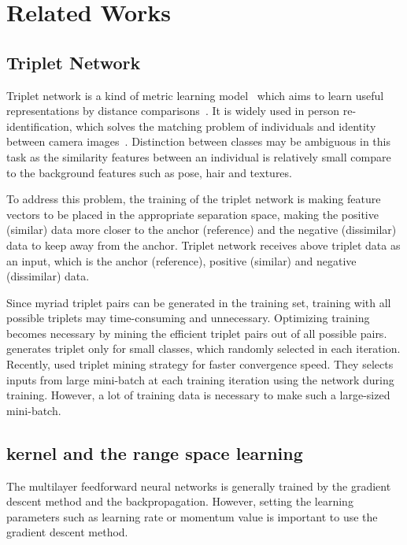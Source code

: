 \documentclass[runningheads]{llncs}
\begin{document}
\section{Related Works}

\subsection{Triplet Network}
Triplet network is a kind of metric learning model~\cite{} which aims to learn useful representations by distance comparisons~\cite{hoffer2015deep}. It is widely used in person re-identification, which solves the matching problem of individuals and identity between camera images~\cite{chen2017beyond,cheng2016person,ding2015deep,schroff2015facenet,wang2016joint}. 
Distinction between classes may be ambiguous in this task as the similarity features between an individual is relatively small compare to the background features such as pose, hair and textures.

To address this problem, the training of the triplet network is making feature vectors to be placed in the appropriate separation space, making the positive (similar) data more closer to the anchor (reference) and the negative (dissimilar) data to keep away from the anchor. Triplet network receives above triplet data as an input, which is the anchor (reference), positive (similar) and negative (dissimilar) data.

Since myriad triplet pairs can be generated in the training set, training with all possible triplets may time-consuming and unnecessary. Optimizing training becomes necessary by mining the efficient triplet pairs out of all possible pairs.
\cite{cheng2016person,ding2015deep,wang2016joint} generates triplet only for small classes, which randomly selected in each iteration.
Recently, \cite{schroff2015facenet} used triplet mining strategy for faster convergence speed. They selects inputs from large mini-batch at each training iteration using the network during training.
However, a lot of training data is necessary to make such a large-sized mini-batch.

\subsection{kernel and the range space learning}\label{kar}

The multilayer feedforward neural networks is generally trained by the gradient descent method and the backpropagation.
However, setting the learning parameters such as learning rate or momentum value is important to use the gradient descent method. 
\end{document}
